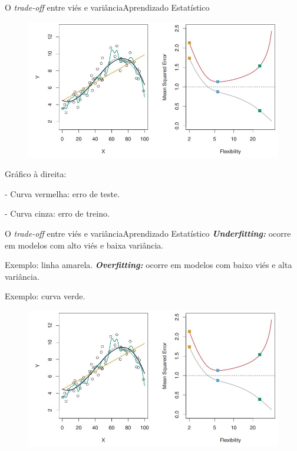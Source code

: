 \documentclass[t]{beamer}
\begin{document}

\begin{ftst}{O \textit{trade-off} entre viés e variância}{{Aprendizado Estatístico}}
\justifying
\begin{figure}
    \centering
    \includegraphics[scale=0.35]{Figuras/slide03_12.jpg}
\end{figure}
\small
Gráfico à direita:

- Curva vermelha: erro de teste.

- Curva cinza: erro de treino.

\end{ftst}


\begin{ftst}{O \textit{trade-off} entre viés e variância}{{Aprendizado Estatístico}}
\justifying
\textit{\textbf{Underfitting: }}ocorre em modelos com alto viés e baixa variância.

Exemplo: linha amarela.
\vone
\textit{\textbf{Overfitting:}} ocorre em modelos com baixo viés e alta variância.

Exemplo: curva verde.

\begin{figure}
    \centering
    \includegraphics[scale=0.4]{Figuras/slide03_12.jpg}
\end{figure}

\end{ftst}
\end{document}
